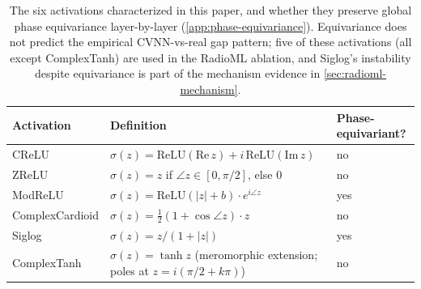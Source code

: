 \documentclass{article}
\providecommand{\Cref}[1]{\autoref{#1}}
\begin{document}
\begin{table}[h]
\centering
\small
\begin{tabular}{lll}
\toprule
\textbf{Activation} & \textbf{Definition} & \textbf{Phase-equivariant?} \\
\midrule
CReLU
  & $\sigma(z) = \mathrm{ReLU}(\mathrm{Re}\,z) + i\,\mathrm{ReLU}(\mathrm{Im}\,z)$
  & no \\
ZReLU
  & $\sigma(z) = z$ if $\angle z \in [0, \pi/2]$, else $0$
  & no \\
ModReLU
  & $\sigma(z) = \mathrm{ReLU}(|z| + b) \cdot e^{i \angle z}$
  & yes \\
ComplexCardioid
  & $\sigma(z) = \tfrac{1}{2}(1 + \cos \angle z) \cdot z$
  & no \\
Siglog
  & $\sigma(z) = z / (1 + |z|)$
  & yes \\
ComplexTanh
  & $\sigma(z) = \tanh z$ (meromorphic extension; poles at $z = i(\pi/2 + k\pi)$)
  & no \\
\bottomrule
\end{tabular}
\caption{The six activations characterized in this paper, and whether
they preserve global phase equivariance layer-by-layer
(\Cref{app:phase-equivariance}). Equivariance does not predict
the empirical CVNN-vs-real gap pattern; five of these activations
(all except ComplexTanh) are used in the RadioML ablation, and
Siglog's instability despite equivariance is part of the mechanism
evidence in \Cref{sec:radioml-mechanism}.}
\label{tab:activations}
\end{table}
\end{document}

